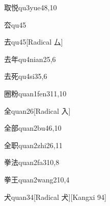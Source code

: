 \begin{entry}{取悦}{qu3yue4}{8,10}
\end{entry}

\begin{entry}{厺}{qu4}{5}
\end{entry}

\begin{entry}{去}{qu4}{5}[Radical 厶]
\end{entry}

\begin{entry}{去年}{qu4nian2}{5,6}
\end{entry}

\begin{entry}{去死}{qu4si3}{5,6}
\end{entry}

\begin{entry}{圈粉}{quan1fen3}{11,10}
\end{entry}

\begin{entry}{全}{quan2}{6}[Radical 入]
\end{entry}

\begin{entry}{全部}{quan2bu4}{6,10}
\end{entry}

\begin{entry}{全职}{quan2zhi2}{6,11}
\end{entry}

\begin{entry}{拳法}{quan2fa3}{10,8}
\end{entry}

\begin{entry}{拳王}{quan2wang2}{10,4}
\end{entry}

\begin{entry}{犬}{quan3}{4}[Radical 犬][Kangxi 94]
\end{entry}

